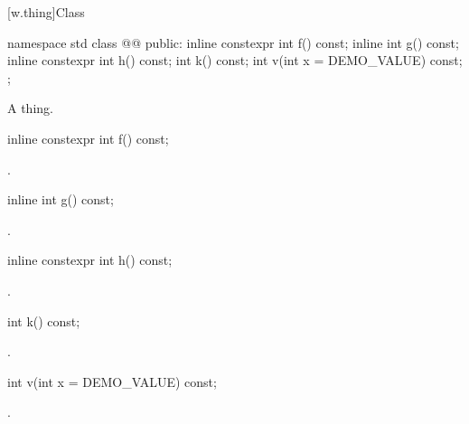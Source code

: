 [w.thing]{Class }

\begin{codeblock}
namespace std {
  class @@ {
  public:
    inline constexpr int f() const;
    inline int g() const;
    inline constexpr int h() const;
    int k() const;
    int v(int x = DEMO_VALUE) const;
  };
}
\end{codeblock}

\pnum
A thing.

%
\begin{itemdecl}
inline constexpr int f() const;
\end{itemdecl}

\begin{itemdescr}
\pnum
{}.
\end{itemdescr}

%
\begin{itemdecl}
inline int g() const;
\end{itemdecl}

\begin{itemdescr}
\pnum
{}.
\end{itemdescr}

%
\begin{itemdecl}
inline constexpr int h() const;
\end{itemdecl}

\begin{itemdescr}
\pnum
{}.
\end{itemdescr}

%
\begin{itemdecl}
int k() const;
\end{itemdecl}

\begin{itemdescr}
\pnum
{}.
\end{itemdescr}

%
\begin{itemdecl}
int v(int x = DEMO_VALUE) const;
\end{itemdecl}

\begin{itemdescr}
\pnum
\returns
{}.
\end{itemdescr}
